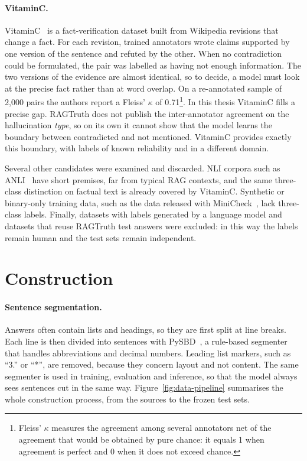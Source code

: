 \paragraph{VitaminC.} VitaminC~\cite{schuster2021vitaminc,hf_vitaminc} is a fact-verification dataset built from
Wikipedia revisions that change a fact. For each revision, trained annotators wrote claims supported by one version of
the sentence and refuted by the other. When no contradiction could be formulated, the pair was labelled as having not
enough information. The two versions of the evidence are almost identical, so to decide, a model must look at the
precise fact rather than at word overlap. On a re-annotated sample of 2{,}000 pairs the authors report a Fleiss'
$\kappa$ of 0.71\footnote{Fleiss' $\kappa$ measures the agreement among several annotators net of the agreement that
would be obtained by pure chance: it equals 1 when agreement is perfect and 0 when it does not exceed chance.}. In this
thesis VitaminC fills a precise gap. RAGTruth does not publish the inter-annotator agreement on the hallucination
\emph{type}, so on its own it cannot show that the model learns the boundary between contradicted and not mentioned.
VitaminC provides exactly this boundary, with labels of known reliability and in a different domain.

Several other candidates were examined and discarded. NLI corpora such as ANLI~\cite{nie2020anli} have short premises,
far from typical RAG contexts, and the same three-class distinction on factual text is already covered by VitaminC.
Synthetic or binary-only training data, such as the data released with MiniCheck~\cite{tang2024minicheck}, lack
three-class labels. Finally, datasets with labels generated by a language model and datasets that reuse RAGTruth test
answers were excluded: in this way the labels remain human and the test sets remain independent.

\section{Construction}
\label{sec:data-construction}

\paragraph{Sentence segmentation.} Answers often contain lists and headings, so they are first split at line breaks.
Each line is then divided into sentences with PySBD~\cite{sadvilkar2020pysbd}, a rule-based segmenter that handles
abbreviations and decimal numbers. Leading list markers, such as ``3.'' or ``*'', are removed, because they concern
layout and not content. The same segmenter is used in training, evaluation and inference, so that the model always sees
sentences cut in the same way. Figure~\ref{fig:data-pipeline} summarises the whole construction process, from the
sources to the frozen test sets.


